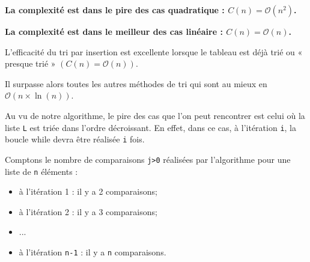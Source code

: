 \begin{prop}[Complexité]
%
%
%


\textbf{La complexité est dans le pire des cas quadratique : $C(n)=\mathcal{O}(n^2)$.}

\textbf{La complexité est dans le meilleur des cas linéaire : $C(n)=\mathcal{O}(n)$.}
 

L'efficacité du tri par insertion est excellente lorsque le tableau est déjà trié ou « presque trié » $(C(n)=\mathcal{O}(n))$. 

Il surpasse alors toutes les autres méthodes de tri qui sont au mieux en $\mathcal{O}(n \times \ln(n))$.
\end{prop}


Au vu de notre algorithme, le pire des cas que l'on peut rencontrer est celui où la liste \texttt{L} est triée dans l'ordre décroissant. En effet, dans ce cas, à l'itération \texttt{i}, la boucle while devra être réalisée \texttt{i} fois. 

Comptons le nombre de comparaisons \texttt{j>0} réalisées par l'algorithme pour une liste de \texttt{n} éléments :
\begin{itemize}
\item à l'itération 1 : il y a 2 comparaisons; 
\item à l'itération 2 : il y a 3 comparaisons; 
\item ...
\item à l'itération \texttt{n-1} : il y a \texttt{n} comparaisons.
\end{itemize}


